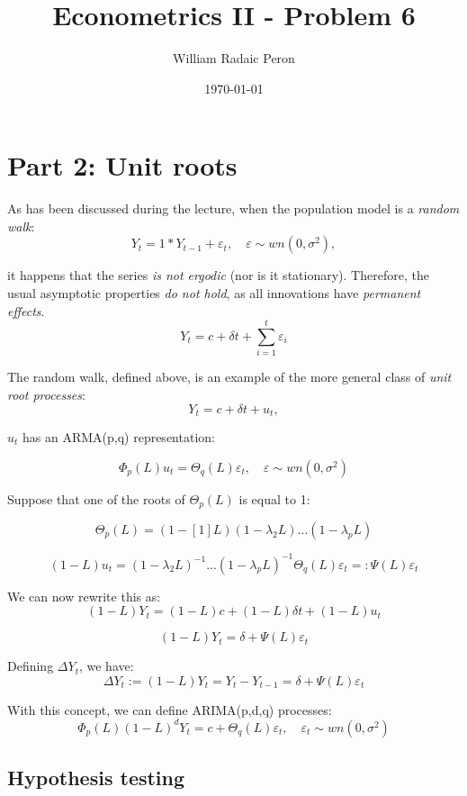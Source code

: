 \documentclass[
]{article}
\title{Econometrics II - Problem 6}
\author{William Radaic Peron}
\date{\today}
\begin{document}
\maketitle

\section{Part 2: Unit roots}

As has been discussed during the lecture, when the population model is a
\emph{random walk}:
\[ Y_t = 1*Y_{t-1} + \varepsilon_t, \hspace{1em} \varepsilon \sim wn(0, \sigma^2), \]

it happens that the series \emph{is not ergodic} (nor is it stationary).
Therefore, the usual asymptotic properties \emph{do not hold}, as all
innovations have \emph{permanent effects}.
\[ Y_t = c + \delta t + \sum_{i=1}^t \varepsilon_i \]

The random walk, defined above, is an example of the more general class
of \emph{unit root processes}: \[ Y_t = c + \delta t + u_t,\]

\(u_t\) has an ARMA(p,q) representation:

\[ \Phi_p (L) u_t = \Theta_q (L) \varepsilon_t, \hspace{1em} \varepsilon \sim wn(0, \sigma^2)\]

Suppose that one of the roots of \(\Theta_p (L)\) is equal to 1:

\[ \Theta_p (L) = (1 - [1]L)(1 - \lambda_2 L)...(1 - \lambda_p L)\]

\[ (1 - L)u_t = (1 - \lambda_2 L)^{-1} ... (1 - \lambda_p L)^{-1} \Theta_q (L) \varepsilon_t =: \Psi(L) \varepsilon_t \]

We can now rewrite this as:
\[ (1- L)Y_t = (1-L)c + (1-L)\delta t + (1-L)u_t \]

\[ (1 - L)Y_t = \delta + \Psi (L) \varepsilon_t \]

Defining \(\Delta Y_t\), we have:
\[ \Delta Y_t := (1 - L)Y_t = Y_t - Y_{t-1} = \delta + \Psi (L) \varepsilon_t \]

With this concept, we can define ARIMA(p,d,q) processes:
\[ \Phi_p (L) (1-L)^d Y_t = c + \Theta_q (L) \varepsilon_t, \hspace{1em} \varepsilon_t \sim wn(0, \sigma^2) \]

\subsection{Hypothesis testing}
\end{document}
